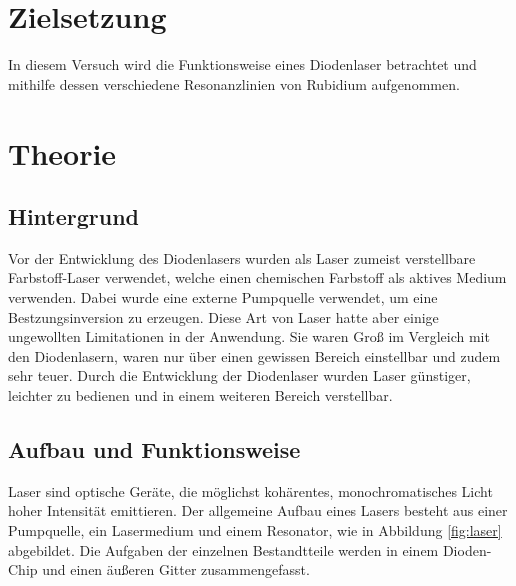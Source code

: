 \section{Zielsetzung}
\label{sec:Zielsetzung}
In diesem Versuch wird die Funktionsweise eines Diodenlaser betrachtet und
mithilfe dessen verschiedene Resonanzlinien von Rubidium aufgenommen.

\section{Theorie}
\label{sec:Theorie}

\subsection{Hintergrund}
Vor der Entwicklung des Diodenlasers wurden als Laser zumeist verstellbare Farbstoff-Laser
verwendet, welche einen chemischen Farbstoff als aktives Medium verwenden.
Dabei wurde eine externe Pumpquelle verwendet, um eine Bestzungsinversion zu
erzeugen. Diese Art von Laser hatte aber einige ungewollten Limitationen in
der Anwendung. Sie waren Groß im Vergleich mit den Diodenlasern, waren nur über
einen gewissen Bereich einstellbar und zudem sehr teuer. Durch die Entwicklung
der Diodenlaser wurden Laser günstiger, leichter zu bedienen und in einem weiteren
Bereich verstellbar.

\subsection{Aufbau und Funktionsweise}
Laser sind optische Geräte, die möglichst kohärentes, monochromatisches Licht
hoher Intensität emittieren.
Der allgemeine Aufbau eines Lasers besteht aus einer Pumpquelle, ein Lasermedium
und einem Resonator, wie in Abbildung \ref{fig:laser} abgebildet.
Die Aufgaben der einzelnen Bestandtteile werden in einem Dioden-Chip und einen
äußeren Gitter zusammengefasst.

